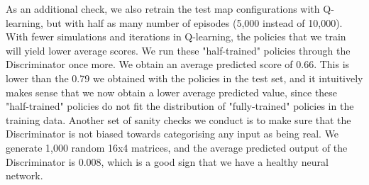 
As an additional check, we also retrain the test map configurations with Q-learning, but with half as many number of episodes (5,000 instead of 10,000). With fewer simulations and iterations in Q-learning, the policies that we train will yield lower average scores. We run these "half-trained" policies through the Discriminator once more. We obtain an average predicted score of 0.66. This is lower than the 0.79 we obtained with the policies in the test set, and it intuitively makes sense that we now obtain a lower average predicted value, since these "half-trained" policies do not fit the distribution of "fully-trained" policies in the training data.
Another set of sanity checks we conduct is to make sure that the Discriminator is not biased towards categorising any input as being real. We generate 1,000 random 16x4 matrices, and the average predicted output of the Discriminator is 0.008, which is a good sign that we have a healthy neural network.

